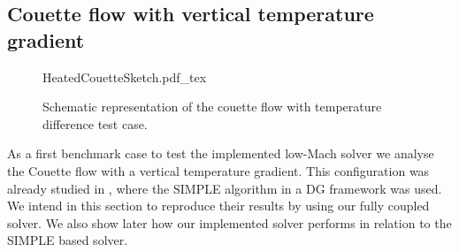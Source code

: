 \FloatBarrier

\subsection{Couette flow with vertical temperature gradient} \label{ssec:CouetteFlowTempDiff}
\begin{figure}[tb]
	\begin{center}
		\def\svgwidth{0.5\textwidth}
		{HeatedCouetteSketch.pdf_tex}
		\caption{Schematic representation of the couette flow with temperature difference test case.}
		\label{fig:CouetteTempDiff_scheme}
	\end{center}	
\end{figure} 

As a first benchmark case to test the implemented low-Mach solver we analyse the Couette flow with a vertical temperature gradient. This configuration was already studied in \citep{kleinHighorderDiscontinuousGalerkin2016}, where the SIMPLE algorithm in a DG framework was used. We intend in this section to reproduce their results by using our fully coupled solver. 
We also show later how our implemented solver performs in relation to the SIMPLE based solver.%

